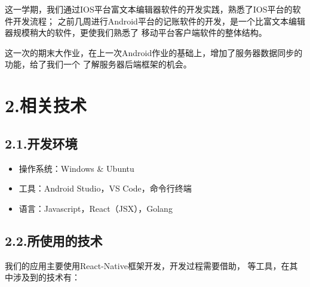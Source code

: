 \documentclass{article}
\begin{document}
这一学期，我们通过IOS平台富文本编辑器软件的开发实践，熟悉了IOS平台的软件开发流程；
之前几周进行Android平台的记账软件的开发，是一个比富文本编辑器规模稍大的软件，更使我们熟悉了
移动平台客户端软件的整体结构。%

这一次的期末大作业，在上一次Android作业的基础上，增加了服务器数据同步的功能，给了我们一个
了解服务器后端框架的机会。%

\section{2.\hspace*{0.5em}相关技术}\label{section}%

\subsection{2.1.\hspace*{0.5em}开发环境}\label{section}%

\begin{itemize}[noitemsep,topsep=\mdcompacttopsep]%

\item{}操作系统：Windows \& Ubuntu%

\item{}工具：Android Studio，VS Code，命令行终端%

\item{}语言：Javascript，React（JSX），Golang%
\end{itemize}%

\subsection{2.2.\hspace*{0.5em}所使用的技术}\label{section}%

\noindent{}我们的应用主要使用React-Native框架开发，开发过程需要借助，
等工具，在其中涉及到的技术有：%
\end{document}
